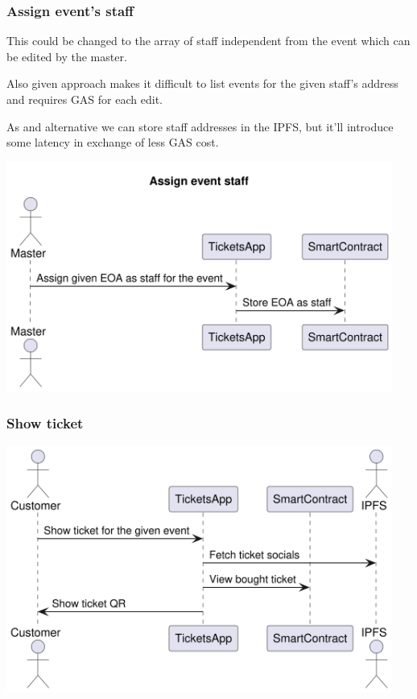 \documentclass[11pt]{article}
\begin{document}
\subsubsection{Assign event's staff}
\label{sec:org577bacb}

This could be changed to the array of staff independent from the event which can be edited by the master.

Also given approach makes it difficult to list events for the given staff's address and requires GAS for each edit.

As and alternative we can store staff addresses in the IPFS, but it'll introduce some latency in exchange of less GAS cost.

\begin{center}
\includegraphics[width=0.95\textwidth]{./img/assign-event-staff.png}
\label{org8e9f852}
\end{center}
\subsubsection{Show ticket}
\label{sec:orgaccd666}

\begin{center}
\includegraphics[width=0.95\textwidth]{./img/show-ticket.png}
\label{orgcd8b5d5}
\end{center}
\end{document}
